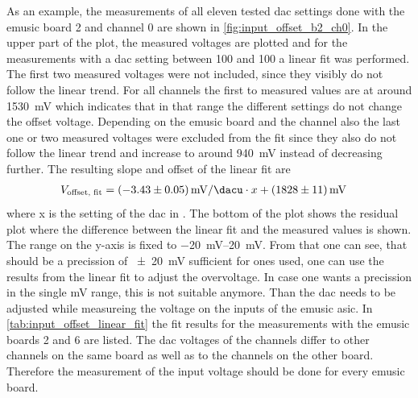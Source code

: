 As an example, the measurements of all eleven tested \ac{dac} settings done with the \ac{emusic} board 2 and channel 0 are shown in \autoref{fig:input_offset_b2_ch0}.
In the upper part of the plot, the measured voltages are plotted and for the measurements with a \ac{dac} setting between \SI{100}{\dacu} and \SI{100}{\dacu} a linear fit was performed.
The first two measured voltages were not included, since they visibly do not follow the linear trend.
For all channels the first to measured values are at around \SI{1530}{\milli\volt} which indicates that in that \si{\dacu} range the different settings do not change the offset voltage.
Depending on the \ac{emusic} board and the channel also the last one or two measured voltages were excluded from the fit since they also do not follow the linear trend and increase to around \SI{940}{\milli\volt} instead of decreasing further.
The resulting slope and offset of the linear fit are
\begin{align}
    V_\text{offset, fit} &= \SI{-3.43(5)}{\milli\volt\per\dacu}\cdot x+\SI{1828(11)}{\milli\volt}
\end{align}
where x is the setting of the \ac{dac} in \si{\dacu}.
The bottom of the plot shows the residual plot where the difference between the linear fit and the measured values is shown.
The range on the y-axis is fixed to \SIrange{-20}{20}{\milli\volt}.
From that one can see, that should be a precission of \SI{+-20}{\milli\volt} sufficient for ones used, one can use the results from the linear fit to adjust the overvoltage.
In case one wants a precission in the single \si{\milli\volt} range, this is not suitable anymore.
Than the \ac{dac} needs to be adjusted while measureing the voltage on the inputs of the \ac{emusic} \ac{asic}.
In \autoref{tab:input_offset_linear_fit} the fit results for the measurements with the \ac{emusic} boards 2 and 6 are listed.
The \ac{dac} voltages of the channels differ to other channels on the same board as well as to the channels on the other board.
Therefore the measurement of the input voltage should be done for every \ac{emusic} board.
